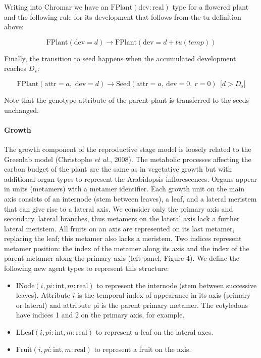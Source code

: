 \documentclass[phd]{infthesis}
\begin{document}
Writing into Chromar we have an
\(\text{FPlant}(\text{dev}:\text{real})\) type for a flowered plant and
the following rule for its development that follows from the
\(\text{tu}\) definition above:

\[\text{FPlant}\left( \text{dev} = d \right) \rightarrow \text{FPlant}(\text{dev} = d + tu(temp))\]

Finally, the transition to seed happens when the accumulated development
reaches \(D_{s}\):

\[\text{FPlant}\left( \text{attr} = a,\text{\ dev} = d \right) \rightarrow \text{Seed}\left( \text{attr} = a,\ \text{dev} = 0,\ r = 0 \right)\ \ \lbrack d > D_{s}\rbrack\]

Note that the genotype attribute of the parent plant is transferred to
the seeds unchanged.

\paragraph{Growth}
\label{growth-1}

The growth component of the reproductive stage model is loosely related
to the Greenlab model (Christophe \emph{et al.}, 2008). The metabolic
processes affecting the carbon budget of the plant are the same as in
vegetative growth but with additional organ types to represent the
Arabidopsis inflorescences. Organs appear in units (metamers) with a
metamer identifier. Each growth unit on the main axis consists of an
internode (stem between leaves), a leaf, and a lateral meristem that can
give rise to a lateral axis. We consider only the primary axis and
secondary, lateral branches, thus metamers on the lateral axis lack a
further lateral meristem. All fruits on an axis are represented on its
last metamer, replacing the leaf; this metamer also lacks a meristem.
Two indices represent metamer position: the index of the metamer along
its axis and the index of the parent metamer along the primary axis
(left panel, Figure 4). We define the following new agent types to
represent this structure:

\begin{itemize}
\item
  \(\text{INode}(i,pi:\text{int},m:\text{real})\) to represent the
  internode (stem between successive leaves). Attribute \(i\) is the
  temporal index of appearance in its axis (primary or lateral) and
  attribute \(\text{pi}\) is the parent primary metamer. The cotyledons
  have indices 1 and 2 on the primary axis, for example.
\item
  \(\text{LLeaf}(i,pi:\text{int},m:\text{real})\) to represent a leaf on
  the lateral axes.
\item
  \(\text{Fruit}(i,pi:\text{int},m:\text{real})\) to represent a fruit
  on the axis.
\end{itemize}
\end{document}
